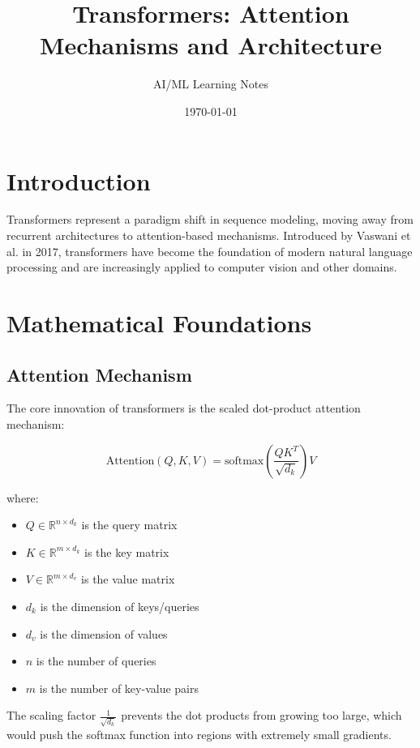 \documentclass[12pt,a4paper]{article}
\title{Transformers: Attention Mechanisms and Architecture}
\author{AI/ML Learning Notes}
\date{\today}
\begin{document}
\maketitle
\tableofcontents
\newpage

\section{Introduction}

Transformers represent a paradigm shift in sequence modeling, moving away from recurrent architectures to attention-based mechanisms. Introduced by Vaswani et al. in 2017, transformers have become the foundation of modern natural language processing and are increasingly applied to computer vision and other domains.

\section{Mathematical Foundations}

\subsection{Attention Mechanism}

The core innovation of transformers is the scaled dot-product attention mechanism:

\begin{equation}
\text{Attention}(Q, K, V) = \text{softmax}\left(\frac{QK^T}{\sqrt{d_k}}\right)V
\end{equation}

where:
\begin{itemize}
    \item $Q \in \mathbb{R}^{n \times d_k}$ is the query matrix
    \item $K \in \mathbb{R}^{m \times d_k}$ is the key matrix
    \item $V \in \mathbb{R}^{m \times d_v}$ is the value matrix
    \item $d_k$ is the dimension of keys/queries
    \item $d_v$ is the dimension of values
    \item $n$ is the number of queries
    \item $m$ is the number of key-value pairs
\end{itemize}

The scaling factor $\frac{1}{\sqrt{d_k}}$ prevents the dot products from growing too large, which would push the softmax function into regions with extremely small gradients.
\end{document}
